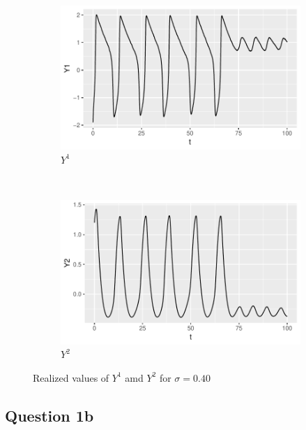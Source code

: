 \documentclass[a4paper]{article}
\begin{document}
\begin{figure}
    \centering
    \begin{subfigure}[b]{0.45\textwidth}
        \includegraphics[width=\textwidth]{part1a-sigma4-Y1.pdf}
        \caption{$Y^1$}
    \end{subfigure}
    ~
    \begin{subfigure}[b]{0.45\textwidth}
        \includegraphics[width=\textwidth]{part1a-sigma4-Y2.pdf}
        \caption{$Y^2$}
    \end{subfigure}
    \caption{Realized values of $Y^1$ amd $Y^2$ for $\sigma = 0.40$}\label{fig:part1a-sigma4}
\end{figure}
\clearpage

\subsection{Question 1b}
\end{document}
